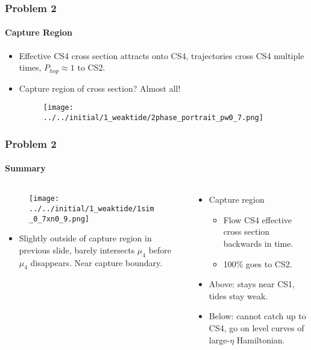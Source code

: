 \documentclass[dvipsnames, 11pt]{beamer}
\begin{document}
\begin{frame}
    \frametitle{Problem 2}
    \framesubtitle{Capture Region}

    \begin{itemize}
        \item Effective CS4 cross section attracts onto CS4, trajectories cross
            CS4 multiple times, $P_{hop} \approx 1$ to CS2.

        \item Capture region of cross section? Almost all!

        \begin{figure}[t]
            \centering
            \texttt{[image: ../../initial/1\_weaktide/2phase\_portrait\_pw0\_7.png]}
        \end{figure}
    \end{itemize}
\end{frame}

\begin{frame}
    \frametitle{Problem 2}
    \framesubtitle{Summary}

    \begin{columns}
        \begin{column}{0.5\textwidth}
            \begin{figure}[t]
                \centering
                \texttt{[image: ../../initial/1\_weaktide/1sim\_0\_7xn0\_9.png]}
            \end{figure}
            \begin{itemize}
                \item Slightly outside of capture region in previous slide,
                    barely intersects $\mu_4$ before $\mu_4$ disappears. Near
                    capture boundary.
            \end{itemize}
        \end{column}
        \begin{column}{0.5\textwidth}
            \begin{itemize}
                \item Capture region
                    \begin{itemize}
                        \item Flow CS4 effective cross section backwards in
                            time.

                        \item 100\% goes to CS2.
                    \end{itemize}

                \item Above: stays near CS1, tides stay weak.

                \item Below: cannot catch up to CS4, go on level curves of
                    large-$\eta$ Hamiltonian.
            \end{itemize}
        \end{column}
    \end{columns}
\end{frame}
\end{document}
